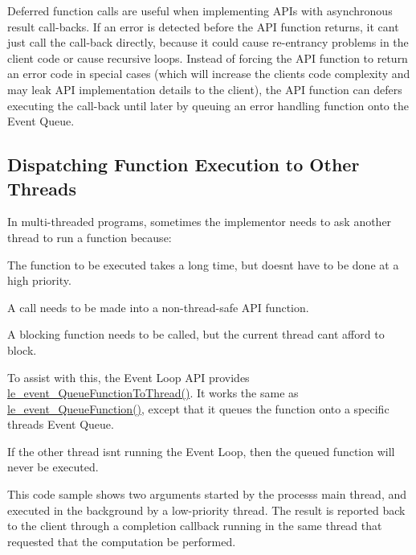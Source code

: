 Deferred function calls are useful when implementing A\+P\+Is with asynchronous result call-\/backs. If an error is detected before the A\+P\+I function returns, it can\textquotesingle{}t just call the call-\/back directly, because it could cause re-\/entrancy problems in the client code or cause recursive loops. Instead of forcing the A\+P\+I function to return an error code in special cases (which will increase the client\textquotesingle{}s code complexity and may leak A\+P\+I implementation details to the client), the A\+P\+I function can defers executing the call-\/back until later by queuing an error handling function onto the Event Queue.\hypertarget{c_event_loop_c_event_dispatchingToOtherThreads}{}\subsection{Dispatching Function Execution to Other Threads}\label{c_event_loop_c_event_dispatchingToOtherThreads}
In multi-\/threaded programs, sometimes the implementor needs to ask another thread to run a function because\+:
\begin{DoxyItemize}
\item The function to be executed takes a long time, but doesn\textquotesingle{}t have to be done at a high priority.
\item A call needs to be made into a non-\/thread-\/safe A\+P\+I function.
\item A blocking function needs to be called, but the current thread can\textquotesingle{}t afford to block.
\end{DoxyItemize}

To assist with this, the Event Loop A\+P\+I provides {\ttfamily \hyperlink{le__event_loop_8h_a228da2d1f53ffa74517f108b0dcfa4d9}{le\+\_\+event\+\_\+\+Queue\+Function\+To\+Thread()}}. It works the same as \hyperlink{le__event_loop_8h_a6dcc88f96060c5bc107a81a978132f38}{le\+\_\+event\+\_\+\+Queue\+Function()}, except that it queues the function onto a specific thread\textquotesingle{}s Event Queue.

If the other thread isn\textquotesingle{}t running the Event Loop, then the queued function will never be executed.

This code sample shows two arguments started by the process\textquotesingle{}s main thread, and executed in the background by a low-\/priority thread. The result is reported back to the client through a completion callback running in the same thread that requested that the computation be performed.


